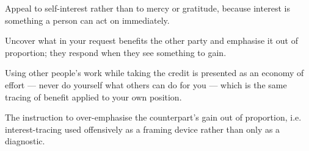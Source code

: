 

\begin{distilled}
  \item Appeal to self-interest rather than to mercy or gratitude, because interest is something a person can act on immediately.
  \item Uncover what in your request benefits the other party and emphasise it out of proportion; they respond when they see something to gain.
  \item Using other people's work while taking the credit is presented as an economy of effort --- never do yourself what others can do for you --- which is the same tracing of benefit applied to your own position.
\end{distilled}

\begin{unique}
  \item The instruction to over-emphasise the counterpart's gain out of proportion, i.e. interest-tracing used offensively as a framing device rather than only as a diagnostic.
\end{unique}
